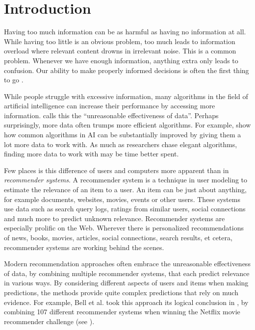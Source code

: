 \section{Introduction}
\label{sec:intro}

Having too much information can be as harmful as having no information at all.
While having too little is an obvious problem,
too much leads to information overload where relevant content drowns in irrelevant noise.
This is a common problem. Whenever we have enough information,
anything extra only leads to confusion.
Our ability to make properly informed decisions is often the first thing to go
\cite[p.1]{Davenport2001}.

While people struggle with excessive information,
many algorithms in the field of artificial intelligence
can increase their performance by accessing more information.
\cite{Halevy2009} calls this the ``unreasonable effectiveness of data''.
Perhaps surprisingly, more data often trumps more efficient algorithms.
For example, \cite[p.3]{Banko2001} show how common algorithms in AI 
can be substantially improved by giving them a lot more data to work with.
As much as researchers chase elegant algorithms, finding more data to work with may be time better spent.

Few places is this difference of users and computers more apparent than in \emph{recommender systems}.
A recommender system is a technique in user modeling to estimate the relevance of an item to a user.
An item can be just about anything, for example documents, websites, movies, events or other users.
These systems use data such as search query logs, 
ratings from similar users, social connections and much more
to predict unknown relevance.
Recommender systems are especially prolific on the Web. 
Wherever there is personalized recommendations of news, books, movies,
articles, social connections, search results, et cetera, recommender systems are working behind the scenes.

Modern recommendation approaches often embrace the 
unreasonable effectiveness of data,
by combining multiple recommender systems, that each predict relevance in various ways.
By considering different aspects of users and items when making predictions,
the methods provide quite complex predictions that rely on much evidence.
For example, Bell et al. took this approach its logical conclusion in \cite{Bell2007}, by 
combining 107 different recommender systems when winning the 
Netflix movie recommender challenge
(see \cite{Linden2009}).

